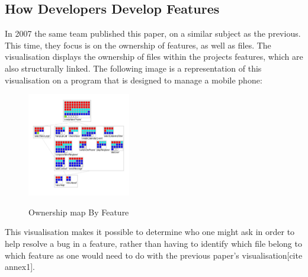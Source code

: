 \subsection{How Developers Develop Features }

In 2007 the same team published this paper, on a similar subject as the previous. This time, they focus is on the ownership of features, as well as files. The visualisation displays the ownership of files within the projects features, which are also structurally linked. The following image is a representation of this visualisation on a program that is designed to manage a mobile phone:

\begin{figure}[H]
\centering
\includegraphics[width=0.4\textwidth]{./resources/girba2007.png}~
\caption{Ownership map By Feature}
\label{fig:ownership_map_by_feature}
\end{figure}

This visualisation makes it possible to determine who one might ask in order to help resolve a bug in a feature, rather than having to identify which file belong to which feature as one would need to do with the previous paper's visualisation[cite annex1].